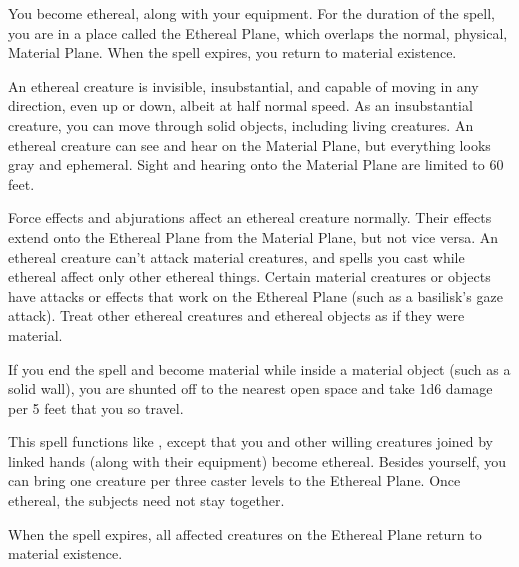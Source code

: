 \spellrng{\rngpers}
\begin{spelleffect}
  You become ethereal, along with your equipment. For the duration of the spell, you are in a place called the Ethereal Plane, which overlaps the normal, physical, Material Plane. When the spell expires, you return to material existence.
  \par An ethereal creature is invisible, insubstantial, and capable of moving in any direction, even up or down, albeit at half normal speed. As an insubstantial creature, you can move through solid objects, including living creatures. An ethereal creature can see and hear on the Material Plane, but everything looks gray and ephemeral. Sight and hearing onto the Material Plane are limited to 60 feet.
  \par Force effects and abjurations affect an ethereal creature normally. Their effects extend onto the Ethereal Plane from the Material Plane, but not vice versa. An ethereal creature can't attack material creatures, and spells you cast while ethereal affect only other ethereal things. Certain material creatures or objects have attacks or effects that work on the Ethereal Plane (such as a basilisk's gaze attack). Treat other ethereal creatures and ethereal objects as if they were material. 
  \par If you end the spell and become material while inside a material object (such as a solid wall), you are shunted off to the nearest open space and take 1d6 damage per 5 feet that you so travel.
\end{spelleffect}

\begin{spelleffect}
  This spell functions like , except that you and other willing creatures joined by linked hands (along with their equipment) become ethereal. Besides yourself, you can bring one creature per three caster levels to the Ethereal Plane. Once ethereal, the subjects need not stay together.
\end{spelleffect}
\begin{spellnotes}
  When the spell expires, all affected creatures on the Ethereal Plane return to material existence.
\end{spellnotes}

